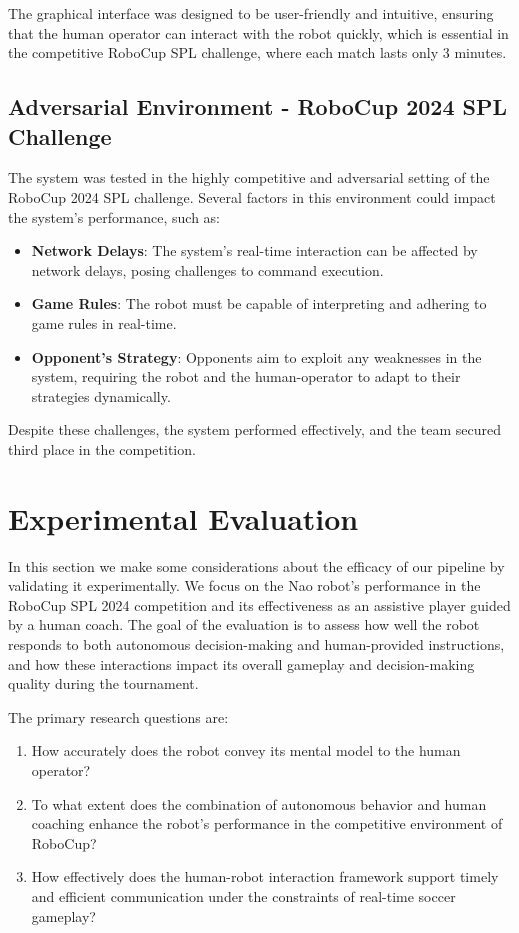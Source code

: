 \documentclass[a4paper, onecolumn, 12pt]{article}
\begin{document}
The graphical interface was designed to be user-friendly and intuitive, ensuring that 
the human operator can interact with the robot quickly, which is essential in the 
competitive RoboCup SPL challenge, where each match lasts only 3 minutes.  

\subsection{Adversarial Environment - RoboCup 2024 SPL Challenge}  
The system was tested in the highly competitive and adversarial setting of the RoboCup 
2024 SPL challenge. Several factors in this environment could impact the system’s 
performance, such as:  
\begin{itemize}  
    \item \textbf{Network Delays}: The system’s real-time interaction can be affected 
    by network delays, posing challenges to command execution.  
    \item \textbf{Game Rules}: The robot must be capable of interpreting and adhering 
    to game rules in real-time.  
    \item \textbf{Opponent's Strategy}: Opponents aim to exploit any weaknesses in the 
    system, requiring the robot and the human-operator to adapt to their strategies dynamically.  
\end{itemize}  
Despite these challenges, the system performed effectively, and the team secured third 
place in the competition.  


\section{Experimental Evaluation} 

In this section we make some considerations about the efficacy of our pipeline by validating it experimentally. We focus on the Nao robot's performance in the RoboCup SPL 2024 competition and its effectiveness as an assistive player guided by a human coach. The goal of the evaluation is to assess how well the robot responds to both autonomous decision-making and human-provided instructions, and how these interactions impact its overall gameplay and decision-making quality during the tournament.

The primary research questions are:

\begin{enumerate}
    \item How accurately does the robot convey its mental model to the human operator?
    \item To what extent does the combination of autonomous behavior and human coaching enhance the robot’s performance in the competitive environment of RoboCup?
    \item How effectively does the human-robot interaction framework support timely and efficient communication under the constraints of real-time soccer gameplay?
\end{enumerate}
\end{document}
